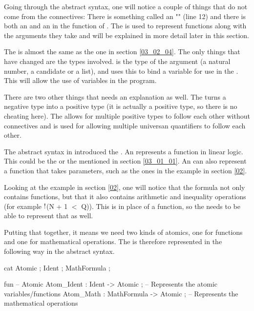 Going through the abstract syntax, one will notice a couple of things that do not come from the connectives: There is something called an "" (line 12) and there is both an  and an  in the function of . The  is used to represent functions along with the arguments they take and will be explained in more detail later in this section.

The  is almost the same as the one in section \ref{03_02_04}. The only things that have changed are the types involved.  is the type of the argument (a natural number, a candidate or a list), and  uses this  to bind a variable for use in the . This will allow the use of variables in the program.

There are two other things that needs an explanation as well. The  turns a negative type into a positive type (it is actually a positive type, so there is no cheating here). The  allows for multiple positive types to follow each other without connectives and is used for allowing multiple universan quantifiers to follow each other.

The abstract syntax in  introduced the . An  represents a function in linear logic. This could be the  or the  mentioned in section \ref{03_01_01}. An  can also represent a function that takes parameters, such as the ones in the example in section \ref{02}.

Looking at the example in section \ref{02}, one will notice that the formula not only contains functions, but that it also contains arithmetic and inequality operations (for example  $\mathord{\text{\rm !}}$(N + 1 $<$ Q)). This is in place of a function, so the  needs to be able to represent that as well.

Putting that together, it means we need two kinds of atomics, one for functions and one for mathematical operations. The  is therefore represented in the following way in the abstract syntax.

\begin{lstgf}
    cat
        Atomic ; Ident ; MathFormula ;

    fun
        -- Atomic
        Atom_Ident : Ident -> Atomic ;          -- Represents the atomic variables/functions
        Atom_Math : MathFormula -> Atomic ;     -- Represents the mathematical operations
\end{lstgf}

